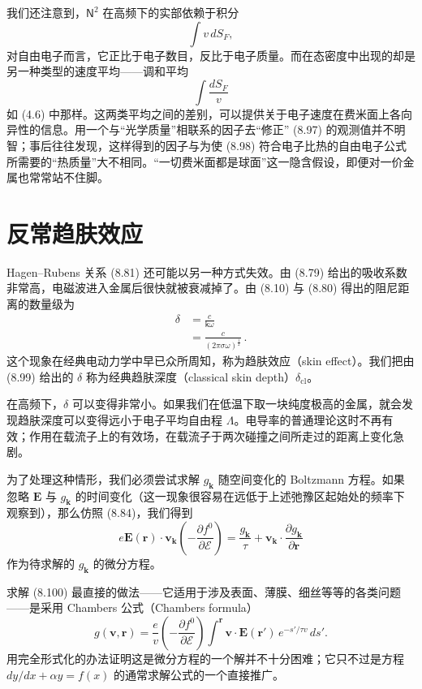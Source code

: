 我们还注意到，$\mathsf{N}^2$ 在高频下的实部依赖于积分
\begin{equation*}
\int v\,dS_F, \tag{8.97}
\end{equation*}
对自由电子而言，它正比于电子数目，反比于电子质量。而在态密度中出现的却是另一种类型的速度平均——调和平均
\begin{equation*}
\int \frac{dS_F}{v} \tag{8.98}
\end{equation*}
如 (4.6) 中那样。这两类平均之间的差别，可以提供关于电子速度在费米面上各向异性的信息。用一个与“光学质量”相联系的因子去“修正” (8.97) 的观测值并不明智；事后往往发现，这样得到的因子与为使 (8.98) 符合电子比热的自由电子公式所需要的“热质量”大不相同。“一切费米面都是球面”这一隐含假设，即便对一价金属也常常站不住脚。

\section{反常趋肤效应}

Hagen–Rubens 关系 (8.81) 还可能以另一种方式失效。由 (8.79) 给出的吸收系数非常高，电磁波进入金属后很快就被衰减掉了。由 (8.10) 与 (8.80) 得出的阻尼距离的数量级为
\begin{align*}
\delta &= \frac{c}{\mathsf{k}\omega} \\
&= \frac{c}{(2\pi\sigma\omega)^{\frac{1}{2}}}\,. \tag{8.99}
\end{align*}
这个现象在经典电动力学中早已众所周知，称为趋肤效应（skin effect）。我们把由 (8.99) 给出的 $\delta$ 称为经典趋肤深度（classical skin depth）$\delta_{\mathrm{cl}}$。

在高频下，$\delta$ 可以变得非常小。如果我们在低温下取一块纯度极高的金属，就会发现趋肤深度可以变得远小于电子平均自由程 $\Lambda$。电导率的普通理论这时不再有效；作用在载流子上的有效场，在载流子于两次碰撞之间所走过的距离上变化急剧。

为了处理这种情形，我们必须尝试求解 $g_{\mathbf{k}}$ 随空间变化的 Boltzmann 方程。如果忽略 $\mathbf{E}$ 与 $g_{\mathbf{k}}$ 的时间变化（这一现象很容易在远低于上述弛豫区起始处的频率下观察到），那么仿照 (8.84)，我们得到
\begin{equation*}
e\mathbf{E}(\mathbf{r})\cdot\mathbf{v}_{\mathbf{k}}\left(-\frac{\partial f^0}{\partial\mathcal{E}}\right) = \frac{g_{\mathbf{k}}}{\tau} + \mathbf{v}_{\mathbf{k}}\cdot\frac{\partial g_{\mathbf{k}}}{\partial\mathbf{r}} \tag{8.100}
\end{equation*}
作为待求解的 $g_{\mathbf{k}}$ 的微分方程。

求解 (8.100) 最直接的做法——它适用于涉及表面、薄膜、细丝等等的各类问题——是采用 Chambers 公式（Chambers formula）
\begin{equation*}
g(\mathbf{v},\mathbf{r}) = \frac{e}{v}\left(-\frac{\partial f^0}{\partial\mathcal{E}}\right)\int^{\mathbf{r}} \mathbf{v}\cdot\mathbf{E}(\mathbf{r}')\,e^{-s'/\tau v}\,ds'. \tag{8.101}
\end{equation*}
用完全形式化的办法证明这是微分方程的一个解并不十分困难；它只不过是方程 $dy/dx+\alpha y=f(x)$ 的通常求解公式的一个直接推广。

